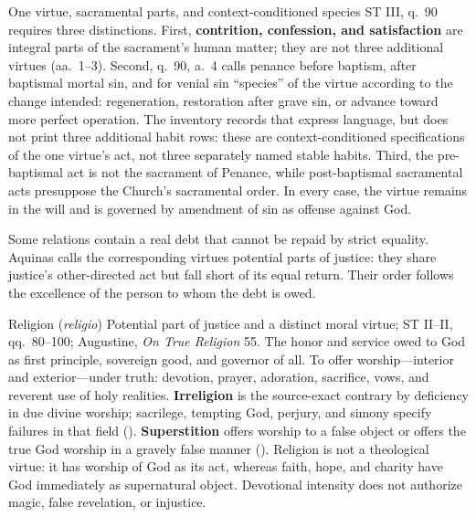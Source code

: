 \begin{studybox}{One virtue, sacramental parts, and context-conditioned species}
ST III, q.~90 requires three distinctions. First, \textbf{contrition, confession, and satisfaction} are integral parts of the sacrament's human matter; they are not three additional virtues (aa.~1--3). Second, q.~90, a.~4 calls penance before baptism, after baptismal mortal sin, and for venial sin ``species'' of the virtue according to the change intended: regeneration, restoration after grave sin, or advance toward more perfect operation. The inventory records that express language, but does not print three additional habit rows: these are context-conditioned specifications of the one virtue's act, not three separately named stable habits. Third, the pre-baptismal act is not the sacrament of Penance, while post-baptismal sacramental acts presuppose the Church's sacramental order. In every case, the virtue remains in the will and is governed by amendment of sin as offense against God.
\end{studybox}


Some relations contain a real debt that cannot be repaid by strict equality. Aquinas calls the corresponding virtues potential parts of justice: they share justice's other-directed act but fall short of its equal return. Their order follows the excellence of the person to whom the debt is owed.


\virtuedossier
  {Religion (\emph{religio})}
  {Potential part of justice and a distinct moral virtue; ST II--II, qq.~80--100; Augustine, \emph{On True Religion} 55.}
  {The honor and service owed to God as first principle, sovereign good, and governor of all.}
  {To offer worship---interior and exterior---under truth: devotion, prayer, adoration, sacrifice, vows, and reverent use of holy realities.}
  {\textbf{Irreligion} is the source-exact contrary by deficiency in due divine worship; sacrilege, tempting God, perjury, and simony specify failures in that field ().}
  {\textbf{Superstition} offers worship to a false object or offers the true God worship in a gravely false manner ().}
  {Religion is not a theological virtue: it has worship of God as its act, whereas faith, hope, and charity have God immediately as supernatural object. Devotional intensity does not authorize magic, false revelation, or injustice.}

